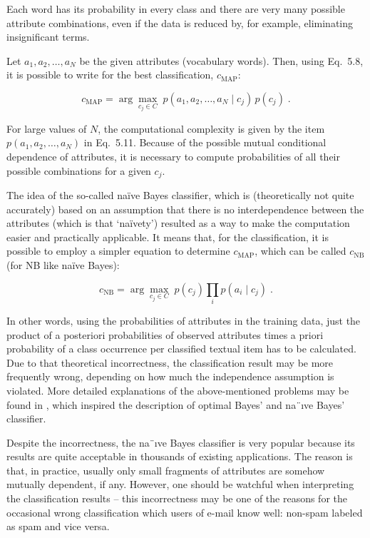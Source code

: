 Each word has its probability in every class and there are very many possible
attribute combinations, even if the data is reduced by, for example, eliminating
insignificant terms.

Let $a_1, a_2, \dots, a_N$ be the given attributes (vocabulary words). Then, using
Eq.~5.8, it is possible to write for the best classification, $c_{\text{MAP}}$:

\[
c_{\text{MAP}} = \arg\max_{c_j \in C} \; p(a_1, a_2, \dots, a_N \mid c_j) \, p(c_j) \;. \tag{5.11}
\]

For large values of $N$, the computational complexity is given by the item
$p(a_1, a_2, \dots, a_N)$ in Eq.~5.11. Because of the possible mutual conditional dependence of attributes, it is necessary to compute probabilities of all their possible
combinations for a given $c_j$.

The idea of the so-called na\"ive Bayes classifier, which is (theoretically not quite
accurately) based on an assumption that there is no interdependence between
the attributes (which is that `na\"ivety') resulted as a way to make the computation
easier and practically applicable. It means that, for the classification, it is possible to employ a simpler equation to determine $c_{\text{MAP}}$, which can be called $c_{\text{NB}}$ (for NB like na\"ive Bayes):

\[
c_{\text{NB}} = \arg\max_{c_j \in C} \; p(c_j) \prod_i p(a_i \mid c_j) \;. \tag{5.12}
\]

In other words, using the probabilities of attributes in the training data, just
the product of a posteriori probabilities of observed attributes times a priori
probability of a class occurrence per classified textual item has to be calculated.
Due to that theoretical incorrectness, the classification result may be more frequently wrong, depending on how much the independence assumption is violated. More detailed explanations of the above-mentioned problems may be
found in \cite{ref199}, which inspired the description of optimal Bayes’ and na¨ıve
Bayes’ classifier.

Despite the incorrectness, the na¨ıve Bayes classifier is very popular because
its results are quite acceptable in thousands of existing applications. The reason
is that, in practice, usually only small fragments of attributes are somehow mutually dependent, if any. However, one should be watchful when interpreting the
classification results – this incorrectness may be one of the reasons for the occasional wrong classification which users of e-mail know well: non-spam labeled
as spam and vice versa.
